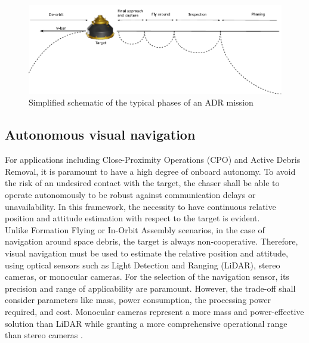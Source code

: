 \begin{figure}[!h]
    \centering
    \includegraphics[width = \linewidth]{Images/phases.pdf}
    \caption{Simplified schematic of the typical phases of an ADR mission}
    \label{fig:phases}
\end{figure}

\subsection{Autonomous visual navigation}
For applications including Close-Proximity Operations (CPO) and Active Debris Removal, it is paramount to have a high degree of onboard autonomy. To avoid the risk of an undesired contact with the target, the chaser shall be able to operate autonomously to be robust against communication delays or unavailability. In this framework, the necessity to have continuous relative position and attitude estimation with respect to the target is evident. \\
Unlike Formation Flying or In-Orbit Assembly scenarios, in the case of navigation around space debris, the target is always non-cooperative. Therefore, visual navigation must be used to estimate the relative position and attitude, using optical sensors such as Light Detection and Ranging (LiDAR), stereo cameras, or monocular cameras. For the selection of the navigation sensor, its precision and range of applicability are paramount. However, the trade-off shall consider parameters like mass, power consumption, the processing power required, and cost. Monocular cameras represent a more mass and power-effective solution than LiDAR while granting a more comprehensive operational range than stereo cameras  \cite{pesce2019autonomous,piccinin2023spacecraft}. \\
